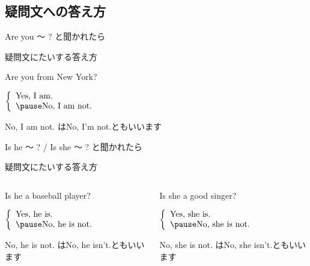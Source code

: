 \documentclass[aspectratio=169]{beamer}
\begin{document}
\subsection{疑問文への答え方}
 \begin{frame}[plain]{Are you 〜 ? と聞かれたら}
 \Large

疑問文にたいする答え方
\vspace{10pt}

\pause

Are you from New York?

\pause

\mbox{}\hspace{100pt}$\left\{\begin{array}{l}
         \text{Yes, I am.}\\\pause
         \text{No, I am not.}
        \end{array}\right.$

\pause

\mbox{}\hfill{}{\small No, I am not. はNo, I'm not.ともいいます}
\end{frame}

\begin{frame}[plain]{Is he  〜 ? / Is she 〜 ? と聞かれたら}
 \Large

疑問文にたいする答え方
\vspace{10pt}

\pause

\begin{columns}
\begin{column}{.475\textwidth}
Is he a baseball player?

\pause

\mbox{}\hspace{40pt}$\left\{\begin{array}{l}
         \text{Yes, he is.}\\\pause
         \text{No, he is not.}
        \end{array}\right.$

\pause

\mbox{}\hfill{}{\footnotesize No, he is not. はNo, he isn't.ともいいます}
\end{column}
\pause
\begin{column}{.475\textwidth}
Is she a good singer?

\pause

\mbox{}\hspace{40pt}$\left\{\begin{array}{l}
         \text{Yes, she is.}\\\pause
         \text{No, she is not.}
        \end{array}\right.$

\pause

\mbox{}\hfill{}{\footnotesize No, she is not. はNo, she isn't.ともいいます}


\end{column}
\end{columns}

\end{frame}
\end{document}
